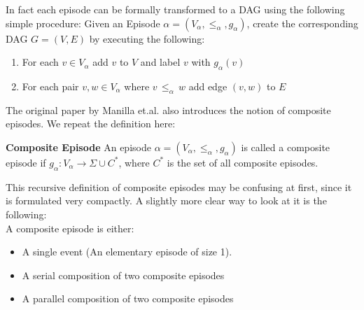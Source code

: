 %

In fact each episode can be formally transformed to a DAG using the following simple procedure: Given an Episode $\alpha = (V_\alpha,{\leq}_{\alpha},g_\alpha)$, create the corresponding DAG $G = (V,E)$ by executing the following:

\begin{enumerate}
	\item For each $v \in V_\alpha$ add $v$ to $V$ and label $v$ with $g_\alpha (v)$
	\item For each pair $v,w \in V_\alpha$ where $v \, {\leq}_{\alpha} \, w $ add edge $(v,w)$ to $E$
\end{enumerate}

The original paper by Manilla et.al. \cite{mannila1995discovering} also introduces the notion of composite episodes. We repeat the definition here:

\begin{mydef}
\label{def_compositeEpisodes}
\textbf{Composite Episode} An episode $\alpha = (V_\alpha,{\leq}_{\alpha},g_\alpha)$ is called a composite episode if $g_\alpha : V_\alpha \rightarrow \Sigma \cup C^*$, where $C^*$ is the set of all composite episodes. \cite{mannila1995discovering}
\end{mydef}

This recursive definition of composite episodes may be confusing at first, since it is formulated very compactly. A slightly more clear way to look at it is the following:\\
A composite episode is either:
\begin{itemize}
	\item A single event (An elementary episode of size 1).
	\item A serial composition of two composite episodes
	\item A parallel composition of two composite episodes
\end{itemize}

